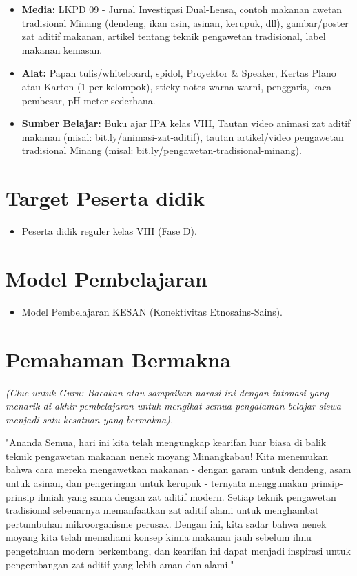\documentclass[a4paper,12pt]{article}
\begin{document}
\begin{itemize}
\item \textbf{Media:} LKPD 09 - Jurnal Investigasi Dual-Lensa, contoh makanan awetan tradisional Minang (dendeng, ikan asin, asinan, kerupuk, dll), gambar/poster zat aditif makanan, artikel tentang teknik pengawetan tradisional, label makanan kemasan.
\item \textbf{Alat:} Papan tulis/whiteboard, spidol, Proyektor \& Speaker, Kertas Plano atau Karton (1 per kelompok), sticky notes warna-warni, penggaris, kaca pembesar, pH meter sederhana.
\item \textbf{Sumber Belajar:} Buku ajar IPA kelas VIII, Tautan video animasi zat aditif makanan (misal: bit.ly/animasi-zat-aditif), tautan artikel/video pengawetan tradisional Minang (misal: bit.ly/pengawetan-tradisional-minang).
\end{itemize}

\section{Target Peserta didik}

\begin{itemize}
\item Peserta didik reguler kelas VIII (Fase D).
\end{itemize}

\section{Model Pembelajaran}

\begin{itemize}
\item Model Pembelajaran KESAN (Konektivitas Etnosains-Sains).
\end{itemize}

\section{Pemahaman Bermakna}
\textit{(Clue untuk Guru: Bacakan atau sampaikan narasi ini dengan intonasi yang menarik di akhir pembelajaran untuk mengikat semua pengalaman belajar siswa menjadi satu kesatuan yang bermakna).}

\begin{tcolorbox}[sectionbox]
"Ananda Semua, hari ini kita telah mengungkap kearifan luar biasa di balik teknik pengawetan makanan nenek moyang Minangkabau! Kita menemukan bahwa cara mereka mengawetkan makanan - dengan garam untuk dendeng, asam untuk asinan, dan pengeringan untuk kerupuk - ternyata menggunakan prinsip-prinsip ilmiah yang sama dengan zat aditif modern. Setiap teknik pengawetan tradisional sebenarnya memanfaatkan zat aditif alami untuk menghambat pertumbuhan mikroorganisme perusak. Dengan ini, kita sadar bahwa nenek moyang kita telah memahami konsep kimia makanan jauh sebelum ilmu pengetahuan modern berkembang, dan kearifan ini dapat menjadi inspirasi untuk pengembangan zat aditif yang lebih aman dan alami."
\end{tcolorbox}
\end{document}
